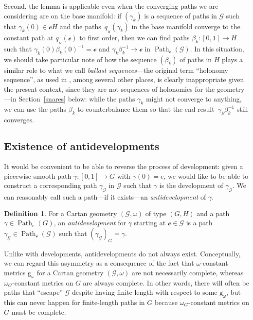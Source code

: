 \documentclass[10pt,a4paper]{amsart}
\numberwithin{equation}{section}
\theoremstyle{definition}
\newtheorem{Definition}[Theorem]{Definition}
\DeclareMathOperator{\Path}{Path}
\begin{document}
Second, the lemma is applicable even when the converging paths we are considering are on the base manifold: if $(\gamma_k)$ is a sequence of paths in $\mathscr{G}$ such that $\gamma_k(0)\in\mathscr{e}H$ and the paths~$q_{{}_H}(\gamma_k)$ in the base manifold converge to the constant path at $q_{{}_H}(\mathscr{e})$ to first order, then we can find paths $\beta_k\colon [0,1]\to H$ such that $\gamma_k(0)\beta_k(0)^{-1}=\mathscr{e}$ and $\gamma_k\beta_k^{-1}\rightarrow\mathscr{e}$ in $\Path_\mathscr{e}(\mathscr{G})$. In this situation, we should take particular note of how the sequence $(\beta_k)$ of paths in $H$ plays a similar role to what we call \textit{ballast sequences}---the original term ``holonomy sequence'', as used in \cite{CapMelnick2013,Frances2007,MelnickNeusser2016}, among several other places, is clearly inappropriate given the present context, since they are not sequences of holonomies for the geometry---in Section~\ref{snares} below: while the paths $\gamma_k$ might not converge to anything, we can use the paths $\beta_k$ to counterbalance them so that the end result~$\gamma_k\beta_k^{-1}$ still converges.

\subsection{Existence of antidevelopments}
It would be convenient to be able to reverse the process of development: given a piecewise smooth path $\gamma \colon [0,1]\to G$ with $\gamma(0)=e$, we would like to be able to construct a corresponding path $\gamma_\mathscr{G}$ in $\mathscr{G}$ such that $\gamma$ is the development of $\gamma_\mathscr{G}$. We can reasonably call such a path---if it exists---an \emph{antidevelopment} of $\gamma$.

\begin{Definition}For a Cartan geometry $(\mathscr{G},\omega)$ of type $(G,H)$ and a path $\gamma\in\Path_e(G)$, an \emph{antidevelopment} for $\gamma$ starting at $\mathscr{e}\in\mathscr{G}$ is a path $\gamma_\mathscr{G}\in\Path_\mathscr{e}(\mathscr{G})$ such that $(\gamma_\mathscr{G})_G=\gamma$.\end{Definition}

Unlike with developments, antidevelopments do not always exist. Conceptually, we can regard this asymmetry as a consequence of the fact that $\omega$-constant metrics $\mathrm{g}_\omega$ for a Cartan geometry $(\mathscr{G},\omega)$ are not necessarily complete, whereas $\omega_G$-constant metrics on $G$ are always complete. In other words, there will often be paths that ``escape'' $\mathscr{G}$ despite having finite length with respect to some $\mathrm{g}_\omega$, but this can never happen for finite-length paths in $G$ because $\omega_G$-constant metrics on $G$ must be complete.
\end{document}
